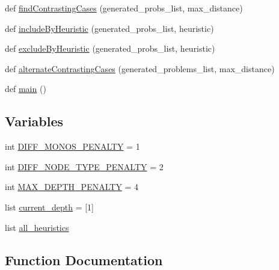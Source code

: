 \begin{DoxyCompactItemize}
\item 
def \hyperlink{namespacedist__metric__eqn_ae8046557c5972d9ffd9c77d25e5abd49}{find\+Contrasting\+Cases} (generated\+\_\+probs\+\_\+list, max\+\_\+distance)
\item 
def \hyperlink{namespacedist__metric__eqn_af77246294f5fbb93d6788c455ae1f827}{include\+By\+Heuristic} (generated\+\_\+probs\+\_\+list, heuristic)
\item 
def \hyperlink{namespacedist__metric__eqn_a3eb6af1e2f9fc3cad956ad7ecb9852d2}{exclude\+By\+Heuristic} (generated\+\_\+probs\+\_\+list, heuristic)
\item 
def \hyperlink{namespacedist__metric__eqn_ada852c0f3c349db11cf1b4ea5da89e74}{alternate\+Contrasting\+Cases} (generated\+\_\+problems\+\_\+list, max\+\_\+distance)
\item 
def \hyperlink{namespacedist__metric__eqn_ad6e4e1db6faa529b0986aad5954f969b}{main} ()
\end{DoxyCompactItemize}
\subsection*{Variables}
\begin{DoxyCompactItemize}
\item 
int \hyperlink{namespacedist__metric__eqn_ac65c2f73b8bc8a1d97a09c48efc58937}{D\+I\+F\+F\+\_\+\+M\+O\+N\+O\+S\+\_\+\+P\+E\+N\+A\+L\+T\+Y} = 1
\item 
int \hyperlink{namespacedist__metric__eqn_a01d67ad0b779a93cdf541bc1ffd0cf2c}{D\+I\+F\+F\+\_\+\+N\+O\+D\+E\+\_\+\+T\+Y\+P\+E\+\_\+\+P\+E\+N\+A\+L\+T\+Y} = 2
\item 
int \hyperlink{namespacedist__metric__eqn_a230e03fde3fb3e89b8816b5ae0fdc4dc}{M\+A\+X\+\_\+\+D\+E\+P\+T\+H\+\_\+\+P\+E\+N\+A\+L\+T\+Y} = 4
\item 
list \hyperlink{namespacedist__metric__eqn_a684e63911b91cc150a8c6e7ace89ea78}{current\+\_\+depth} = \mbox{[}1\mbox{]}
\item 
list \hyperlink{namespacedist__metric__eqn_a6ed7ee3e88472aac349189bc8e620026}{all\+\_\+heuristics}
\end{DoxyCompactItemize}


\subsection{Function Documentation}
\hypertarget{namespacedist__metric__eqn_ada852c0f3c349db11cf1b4ea5da89e74}{}
